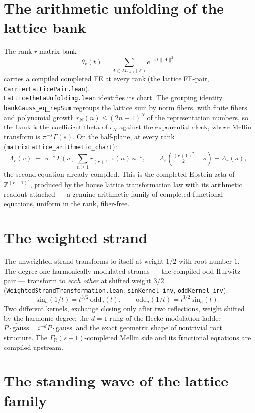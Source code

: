 \documentclass[11pt]{article}
\begin{document}
\section{The arithmetic unfolding of the lattice bank}

The rank-$r$ matrix bank
\[
\theta_r(t)=\sum_{A\in M_{r+1}(\mathbb Z)}e^{-\pi t\|A\|^2}
\]
carries a compiled completed FE at every rank (the lattice FE-pair,
\texttt{CarrierLatticePair.lean}).\\
\texttt{LatticeThetaUnfolding.lean} identifies its chart.  The grouping identity
\texttt{bankGauss\_eq\_repSum} regroups the lattice sum by norm fibers, with finite
fibers and polynomial growth $r_N(n)\le(2n+1)^N$ of the representation numbers, so
the bank is the coefficient theta of $r_N$ against the exponential clock, whose
Mellin transform is $\pi^{-s}\Gamma(s)$.  On the half-plane, at every rank
(\texttt{matrixLattice\_arithmetic\_chart}):
\[
\Lambda_r(s)\;=\;\pi^{-s}\,\Gamma(s)\sum_{n\ge1}r_{(r+1)^2}(n)\,n^{-s},
\qquad
\Lambda_r\!\left(\tfrac{(r+1)^2}{2}-s\right)=\Lambda_r(s),
\]
the second equation already compiled.  This is the completed Epstein zeta of
$\mathbb Z^{(r+1)^2}$, produced by the house lattice transformation law with its arithmetic readout attached
— a genuine arithmetic family of completed functional equations, uniform in the rank,
fiber-free.

\section{The weighted strand}

The unweighted strand transforms to itself at weight $1/2$ with root number $1$.  The
degree-one harmonically modulated strands — the compiled odd Hurwitz pair — transform to
\emph{each other} at shifted weight $3/2$
(\texttt{WeightedStrandTransformation.lean}: \texttt{sinKernel\_inv},
\texttt{oddKernel\_inv}):
\[
\mathrm{sin}_a(1/t)=t^{3/2}\,\mathrm{odd}_a(t),
\qquad
\mathrm{odd}_a(1/t)=t^{3/2}\,\mathrm{sin}_a(t).
\]
Two different kernels, exchange closing only after two reflections, weight shifted by
the harmonic degree: the $d=1$ rung of the Hecke modulation ladder
$\widehat{P\cdot\mathrm{gauss}}=i^{-d}P\cdot\mathrm{gauss}$, and the exact geometric
shape of nontrivial root structure.  The $\Gamma_{\mathbb R}(s+1)$-completed Mellin
side and its functional equations are compiled upstream.

\section{The standing wave of the lattice family}
\end{document}
